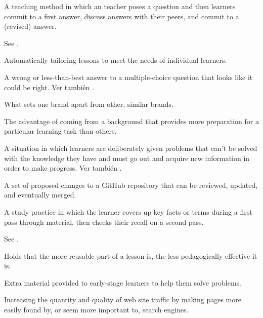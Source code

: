 \begin{description}
 A teaching method in which an
teacher poses a question and then learners commit to a first answer, discuss
answers with their peers, and commit to a (revised) answer.

 See .

 Automatically tailoring
lessons to meet the needs of individual learners.

 A wrong or less-than-best
answer to a multiple-choice question that looks like it could be right. Ver también
.

 What sets one brand apart from other,
similar brands.

 The advantage of coming
from a background that provides more preparation for a particular learning task
than others.

 A situation in which learners
are deliberately given problems that can't be solved with the knowledge they
have and must go out and acquire new information in order to make progress.
Ver también .

 A set of proposed changes to a GitHub
repository that can be reviewed, updated, and eventually merged.

 A study practice in which
the learner covers up key facts or terms during a first pass through material,
then checks their recall on a second pass.

See .

 Holds that the more reusable
part of a lesson is, the less pedagogically effective it is.

 Extra material provided to early-stage
learners to help them solve problems.

 Increasing the quantity and quality
of web site traffic by making pages more easily found by, or seem more important
to, search engines.


\end{description}
